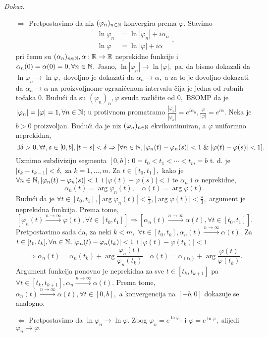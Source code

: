 \documentclass{article}
\begin{document}
\textit{Dokaz.}
\begin{enumerate}
    \item[\(\boxed{\Rightarrow}\)] Pretpostavimo da niz \((\varphi_n)_{n\in\Bbb N}\) konvergira prema \(\varphi.\) Stavimo \[\begin{aligned}\ln\varphi_n&=\ln|\varphi_n|+i\alpha_n\\\ln\varphi&=\ln|\varphi|+i\alpha\end{aligned},\] pri čemu su \((\alpha_n)_{n\in\Bbb N},\alpha:\Bbb R\to\Bbb R\) neprekidne funkcije i \(\alpha_n(0)=\alpha(0)=0,\forall n\in\Bbb N.\) Jasno, \(\ln|\varphi_n|\to\ln|\varphi|,\) pa, da bismo dokazali da \(\ln\varphi_n\to\ln\varphi,\) dovoljno je dokazati da \(\alpha_n\to\alpha,\) a za to je dovoljno dokazati da \(\alpha_n\to\alpha\) na proizvoljnome ograničenom intervalu čija je jedna od rubnih točaka \(0.\) Budući da su \((\varphi_n)_n,\varphi\) svuda različite od \(0,\) BSOMP da je \(|\varphi_n|=|\varphi|=1,\forall n\in\Bbb N\); u protivnom promatramo \(\frac{|\varphi_n|}{|\varphi_n|}=e^{i\alpha_n},\frac{\varphi}{|\varphi|}=e^{i\alpha}.\) Neka je \(b>0\) proizvoljan. Budući da je niz \((\varphi_n)_{n\in\Bbb N}\) ekvikontinuiran, a \(\varphi\) uniformno neprekidna, \[\exists\delta>0,\forall t,s\in[0,b],|t-s|<\delta\Rightarrow[\forall n\in\Bbb N,|\varphi_n(t)-\varphi_n(s)|<1\;\&\;|\varphi(t)-\varphi(s)|<1].\] Uzmimo subdiviziju segmenta \([0,b]\): \(0=t_0<t_1<\cdots<t_m=b\) t. d. je \(|t_k-t_{k-1}|<\delta,\) za \(k=1,\ldots,m.\) Za \(t\in[t_0,t_1],\) kako je \(\forall n\in\Bbb N,|\varphi_n(t)-\varphi_n(s)|<1\) i \(|\varphi(t)-\varphi(s)|<1\) te \(\alpha_n\) i \(\alpha\) neprekidne, \[\alpha_n(t)=\arg\varphi_n(t),\quad\alpha(t)=\arg\varphi(t).\] Budući da je \(\forall t\in[t_0,t_1],|\arg\varphi_n(t)|<\frac\pi3,|\arg\varphi(t)|<\frac\pi3,\) argument je neprekidna funkcija. Prema tome, \[[\varphi_n(t)\overset{n\to\infty}{\longrightarrow}\varphi(t),\forall t\in[t_0,t_1]]\Rightarrow[\alpha_n(t)\overset{n\to\infty}{\longrightarrow}\alpha(t),\forall t\in[t_0,t_1]].\] Pretpostavimo sada da, za neki \(k<m,\) \(\forall t\in[t_0,t_k],\alpha_n(t)\overset{n\to\infty}{\longrightarrow}\alpha(t).\) Za \(t\in[t_0,t_k],\forall n\in\Bbb N,|\varphi_n(t)-\varphi_n(t_k)|<1\) i \(|\varphi(t)-\varphi(t_k)|<1\) \[\Rightarrow\alpha_n(t)=\alpha_n(t_k)+\arg\frac{\varphi_n(t)}{\varphi_n(t_k)}\quad\alpha(t)=\alpha_(t_k)+\arg\frac{\varphi(t)}{\varphi(t_k)}.\] Argument funkcija ponovno je neprekidna za sve \(t\in[t_k,t_{k+1}]\) pa \(\forall t\in[t_k,t_{k+1}],\alpha_n\overset{n\to\infty}{\longrightarrow}\alpha(t).\) Prema tome, \(\alpha_n(t)\overset{n\to\infty}{\longrightarrow}\alpha(t),\forall t\in[0,b],\) a konvergencija na \([-b,0]\) dokazuje se analogno.
    \item[\(\boxed{\Leftarrow}\)] Pretpostavimo da \(\ln\varphi_n\to\ln\varphi.\) Zbog \(\varphi_n=e^{\ln\varphi_n}\) i \(\varphi=e^{\ln\varphi},\) slijedi \(\varphi_n\to\varphi.\)
\end{enumerate}
\end{document}
